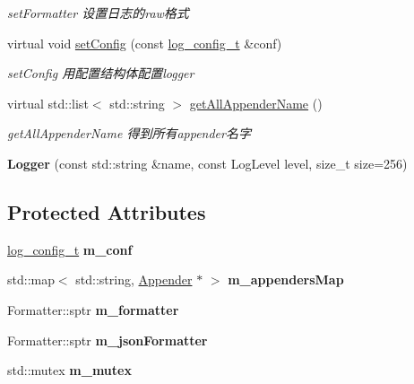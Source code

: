 \begin{DoxyCompactItemize}
\begin{DoxyCompactList}\small\item\em set\+Formatter 设置日志的raw格式 \end{DoxyCompactList}\item 
virtual void \hyperlink{classdaq_1_1Logger_aaec0b6a70d3e3e64704f38464a86b789}{set\+Config} (const \hyperlink{structdaq_1_1LogConfigStruct}{log\+\_\+config\+\_\+t} \&conf)
\begin{DoxyCompactList}\small\item\em set\+Config 用配置结构体配置logger \end{DoxyCompactList}\item 
virtual std\+::list$<$ std\+::string $>$ \hyperlink{classdaq_1_1Logger_ab68517334c0cf8be05b5aeee56d8f2f4}{get\+All\+Appender\+Name} ()
\begin{DoxyCompactList}\small\item\em get\+All\+Appender\+Name 得到所有appender名字 \end{DoxyCompactList}\item 
\mbox{\label{classdaq_1_1Logger_abedfe3414b4a74fa84507a36c88a0a5b}} 
{\bfseries Logger} (const std\+::string \&name, const Log\+Level level, size\+\_\+t size=256)
\end{DoxyCompactItemize}
\subsection*{Protected Attributes}
\begin{DoxyCompactItemize}
\item 
\mbox{\label{classdaq_1_1Logger_ae528a143b73c8253e089a9a1c5a0786c}} 
\hyperlink{structdaq_1_1LogConfigStruct}{log\+\_\+config\+\_\+t} {\bfseries m\+\_\+conf}
\item 
\mbox{\label{classdaq_1_1Logger_af4514fe6c2574ff7448db4c77442c10d}} 
std\+::map$<$ std\+::string, \hyperlink{classdaq_1_1Appender}{Appender} $\ast$ $>$ {\bfseries m\+\_\+appenders\+Map}
\item 
\mbox{\label{classdaq_1_1Logger_a04de83a0c4f8c6178ee977bd8bb00c38}} 
Formatter\+::sptr {\bfseries m\+\_\+formatter}
\item 
\mbox{\label{classdaq_1_1Logger_ab0ca554a6ef8ddbad003df29f3c25ebc}} 
Formatter\+::sptr {\bfseries m\+\_\+json\+Formatter}
\item 
\mbox{\label{classdaq_1_1Logger_ac3b9376e759e14c7cf95a1b38bad9663}} 
std\+::mutex {\bfseries m\+\_\+mutex}
\end{DoxyCompactItemize}


